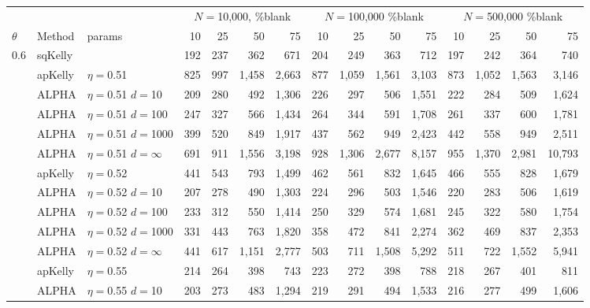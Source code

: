 \documentclass[12pt,runningheads]{llncs}
\begin{document}
{\begin{table}
\centering
\tiny
\begin{tabular}{lll|rrrr|rrrr|rrrr} 
& & & \multicolumn{4}{|c|}{$N=$10,000, \%blank} &  \multicolumn{4}{|c|}{$N=$100,000 \%blank} & \multicolumn{4}{|c}{$N=$500,000 \%blank} \\ 
$\theta$ & Method & params & 10 & 25 & 50 & 75  & 10 & 25 & 50 & 75  & 10 & 25 & 50 & 75  \\
\hline 0.6 & sqKelly & & 192  & 237  & 362  & 671  & 204  & 249  & 363  & 712  & 197  & 242  & 364  & 740  \\
\cline{2-15} & apKelly & $\eta=$0.51 & 825  & 997  & 1,458  & 2,663  & 877  & 1,059  & 1,561  & 3,103  & 873  & 1,052  & 1,563  & 3,146  \\
& ALPHA & $\eta=$0.51 $d=$10 & 209  & 280  & 492  & 1,306  & 226  & 297  & 506  & 1,551  & 222  & 284  & 509  & 1,624  \\
& ALPHA & $\eta=$0.51 $d=$100 & 247  & 327  & 566  & 1,434  & 264  & 344  & 591  & 1,708  & 261  & 337  & 600  & 1,781  \\
& ALPHA & $\eta=$0.51 $d=$1000 & 399  & 520  & 849  & 1,917  & 437  & 562  & 949  & 2,423  & 442  & 558  & 949  & 2,511  \\
 & ALPHA & $\eta=$0.51 $d=\infty$ & 691  & 911  & 1,556  & 3,198  & 928  & 1,306  & 2,677  & 8,157  & 955  & 1,370  & 2,981  & 10,793  \\
\cline{2-15} & apKelly & $\eta=$0.52 & 441  & 543  & 793  & 1,499  & 462  & 561  & 832  & 1,645  & 466  & 555  & 828  & 1,679  \\
& ALPHA & $\eta=$0.52 $d=$10 & 207  & 278  & 490  & 1,303  & 224  & 296  & 503  & 1,546  & 220  & 283  & 506  & 1,619  \\
& ALPHA & $\eta=$0.52 $d=$100 & 233  & 312  & 550  & 1,414  & 250  & 329  & 574  & 1,681  & 245  & 322  & 580  & 1,754  \\
& ALPHA & $\eta=$0.52 $d=$1000 & 331  & 443  & 763  & 1,820  & 358  & 472  & 841  & 2,274  & 362  & 469  & 837  & 2,353  \\
 & ALPHA & $\eta=$0.52 $d=\infty$ & 441  & 617  & 1,151  & 2,777  & 503  & 711  & 1,508  & 5,292  & 511  & 722  & 1,552  & 5,941  \\
\cline{2-15} & apKelly & $\eta=$0.55 & 214  & 264  & 398  & 743  & 223  & 272  & 398  & 788  & 218  & 267  & 401  & 811  \\
& ALPHA & $\eta=$0.55 $d=$10 & 203  & 273  & 483  & 1,294  & 219  & 291  & 494  & 1,533  & 216  & 277  & 499  & 1,606  \\

\end{tabular}
\end{table}}
\end{document}
